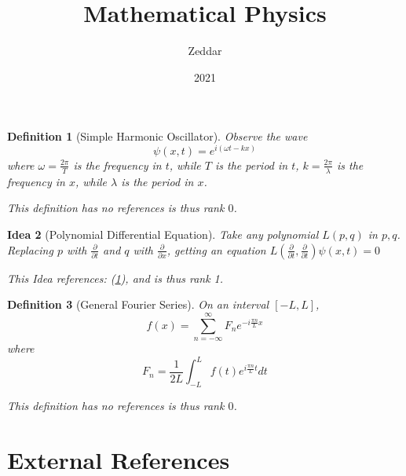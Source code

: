 \documentclass{article}
\title{Mathematical Physics}
\author{Zeddar}
\date{2021}
\newtheorem{definition}{Definition}
\newtheorem{Idea}[definition]{Idea}
\begin{document}
\maketitle

\begin{tcolorbox}[title=Definition: Simple Harmonic Oscillator]\begin{definition}[Simple Harmonic Oscillator]\label{0}Observe the wave $$\psi(x,t)=e^{i(\omega t-kx)}$$ where $\omega=\frac{2\pi}{T}$ is the frequency in $t$, while $T$ is the period in $t$, $k=\frac{2\pi}{\lambda}$ is the frequency in $x$, while $\lambda$ is the period in $x$.
 
 This definition has no references is thus rank $0$.\end{definition}\end{tcolorbox}
\begin{tcolorbox}[title=Idea: Polynomial Differential Equation]\begin{Idea}[Polynomial Differential Equation]\label{1}Take any polynomial $L(p,q)$ in $p,q$. Replacing $p$ with $\frac{\partial}{\partial t}$ and $q$ with $\frac{\partial}{\partial x}$, getting an equation $L\left(\frac{\partial}{\partial t},\frac{\partial}{\partial t}\right)\psi(x,t)=0$
 
 This Idea references: (\ref{0}), and is thus rank 1.\end{Idea}\end{tcolorbox}
\begin{tcolorbox}[title=Definition: General Fourier Series]\begin{definition}[General Fourier Series]\label{2}On an interval $[-L,L]$, $$f(x)=\sum_{n=-\infty}^{\infty}F_n e^{-i\frac{\pi n}{L}x}$$where $$F_n=\frac{1}{2L}\int_{-L}^L f(t)e^{i\frac{\pi n}{L}t}dt$$
 
 This definition has no references is thus rank $0$.\end{definition}\end{tcolorbox}
\section*{External References}
\begin{enumerate}[label={[\arabic*]}]\end{enumerate}
\end{document}
